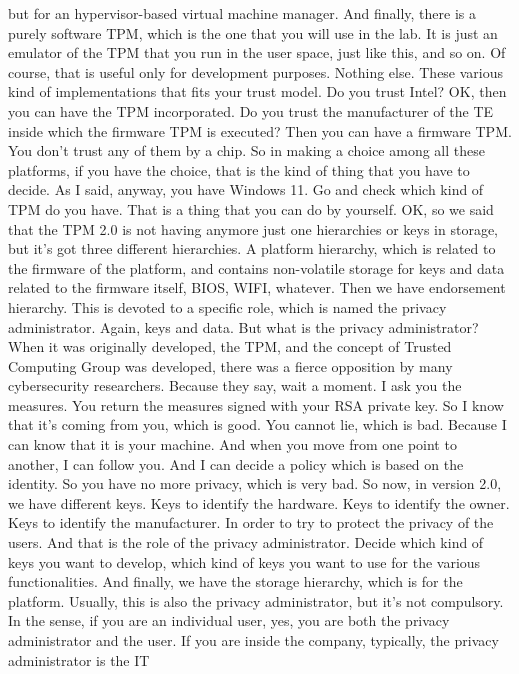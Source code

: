  but for an hypervisor-based virtual machine manager. And finally, there is a
 purely software TPM, which is the one that you will use in the lab. It is just
 an emulator of the TPM that you run in the user space, just like this, and so
 on. Of course, that is useful only for development purposes. Nothing else.
 These various kind of implementations that fits your trust model. Do you trust
 Intel? OK, then you can have the TPM incorporated. Do you trust the
 manufacturer of the TE inside which the firmware TPM is executed? Then you can
 have a firmware TPM. You don't trust any of them by a chip. So in making a
 choice among all these platforms, if you have the choice, that is the kind of
 thing that you have to decide. As I said, anyway, you have Windows 11. Go and
 check which kind of TPM do you have. That is a thing that you can do by
 yourself. OK, so we said that the TPM 2.0 is not having anymore just one
 hierarchies or keys in storage, but it's got three different hierarchies. A
 platform hierarchy, which is related to the firmware of the platform, and
 contains non-volatile storage for keys and data related to the firmware
 itself, BIOS, WIFI, whatever. Then we have endorsement hierarchy. This is
 devoted to a specific role, which is named the privacy administrator. Again,
 keys and data. But what is the privacy administrator? When it was originally
 developed, the TPM, and the concept of Trusted Computing Group was developed,
 there was a fierce opposition by many cybersecurity researchers. Because they
 say, wait a moment. I ask you the measures. You return the measures signed
 with your RSA private key. So I know that it's coming from you, which is good.
 You cannot lie, which is bad. Because I can know that it is your machine. And
 when you move from one point to another, I can follow you. And I can decide a
 policy which is based on the identity. So you have no more privacy, which is
 very bad. So now, in version 2.0, we have different keys. Keys to identify the
 hardware. Keys to identify the owner. Keys to identify the manufacturer. In
 order to try to protect the privacy of the users. And that is the role of the
 privacy administrator. Decide which kind of keys you want to develop, which
 kind of keys you want to use for the various functionalities. And finally, we
 have the storage hierarchy, which is for the platform. Usually, this is also
 the privacy administrator, but it's not compulsory. In the sense, if you are
 an individual user, yes, you are both the privacy administrator and the user.
 If you are inside the company, typically, the privacy administrator is the IT
